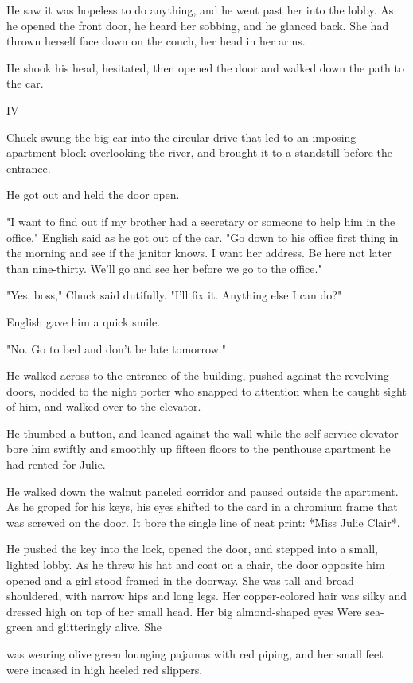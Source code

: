 \documentclass{novel}
\begin{document}
He saw it was hopeless to do anything, and he went past her into the lobby. As he opened the front door, he heard her sobbing, and he glanced back. She had thrown herself face down on the couch, her head in her arms.

He shook his head, hesitated, then opened the door and walked down the path to the car.



IV

Chuck swung the big car into the circular drive that led to an imposing apartment block overlooking the river, and brought it to a standstill before the entrance.

He got out and held the door open.

"I want to find out if my brother had a secretary or someone to help him in the office," English said as he got out of the car. "Go down to his office first thing in the morning and see if the janitor knows. I want her address. Be here not later than nine-thirty. We'll go and see her before we go to the office."

"Yes, boss," Chuck said dutifully. "I'll fix it. Anything else I can do?"

English gave him a quick smile.

"No. Go to bed and don't be late tomorrow."

He walked across to the entrance of the building, pushed against the revolving doors, nodded to the night porter who snapped to attention when he caught sight of him, and walked over to the elevator.

He thumbed a button, and leaned against the wall while the self-service elevator bore him swiftly and smoothly up fifteen floors to the penthouse apartment he had rented for Julie.

He walked down the walnut paneled corridor and paused outside the apartment. As he groped for his keys, his eyes shifted to the card in a chromium frame that was screwed on the door. It bore the single line of neat print: *Miss Julie Clair*.

He pushed the key into the lock, opened the door, and stepped into a small, lighted lobby. As he threw his hat and coat on a chair, the door opposite him opened and a girl stood framed in the doorway. She was tall and broad shouldered, with narrow hips and long legs. Her copper-colored hair was silky and dressed high on top of her small head. Her big almond-shaped eyes Were sea-green and glitteringly alive. She

was wearing olive green lounging pajamas with red piping, and her small feet were incased in high heeled red slippers.
\end{document}

